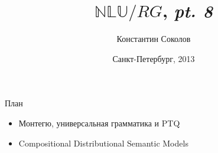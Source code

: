 \documentclass{beamer}
\begin{document}
\title{\huge{$\mathbb{NLU}/RG$, \textit{pt. 8}}}
\author{Константин Соколов}
\date{Санкт-Петербург, 2013} 
\begin{frame}
    \thispagestyle{empty}
    \titlepage
\end{frame}

\begin{frame}{План}
    \setcounter{framenumber}{1}
    \begin{itemize}
        \item Монтегю, универсальная грамматика и PTQ
        \item Compositional Distributional Semantic Models
    \end{itemize}
\end{frame}



\end{document}
